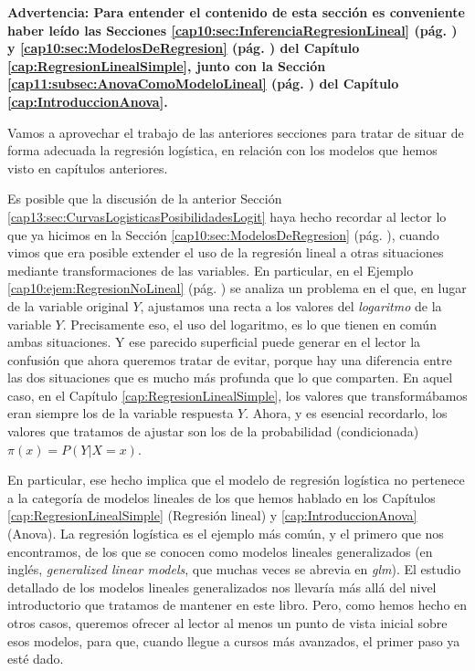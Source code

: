 {\bf Advertencia: Para entender el contenido de esta sección es conveniente haber leído las Secciones \ref{cap10:sec:InferenciaRegresionLineal} (pág. \pageref{cap10:sec:InferenciaRegresionLineal}) y \ref{cap10:sec:ModelosDeRegresion} (pág. \pageref{cap10:sec:ModelosDeRegresion}) del Capítulo \ref{cap:RegresionLinealSimple}, junto con la Sección \ref{cap11:subsec:AnovaComoModeloLineal} (pág. \pageref{cap11:subsec:AnovaComoModeloLineal}) del Capítulo \ref{cap:IntroduccionAnova}.}


Vamos a aprovechar el trabajo de las anteriores secciones para tratar de situar de forma adecuada la regresión logística, en relación con los modelos que hemos visto en capítulos anteriores.

Es posible que la discusión de la anterior Sección \ref{cap13:sec:CurvasLogisticasPosibilidadesLogit} haya hecho recordar al lector lo que ya hicimos en la Sección \ref{cap10:sec:ModelosDeRegresion} (pág. \pageref{cap10:sec:ModelosDeRegresion}), cuando vimos que era posible extender el uso de la regresión lineal a otras situaciones mediante transformaciones de las variables. En particular, en el Ejemplo \ref{cap10:ejem:RegresionNoLineal} (pág. \pageref{cap10:ejem:RegresionNoLineal}) se analiza un problema en el que, en lugar de la variable original $Y$, ajustamos una recta a los valores del {\em logaritmo} de la variable $Y$.  Precisamente eso, el uso del logaritmo, es lo que tienen en común ambas situaciones. Y ese parecido superficial puede generar en el lector la confusión que ahora queremos tratar de evitar, porque hay una diferencia entre las dos situaciones que es mucho más profunda que lo que comparten. En aquel caso, en el Capítulo \ref{cap:RegresionLinealSimple}, los valores que transformábamos eran siempre los de la variable respuesta $Y$. Ahora, y es esencial recordarlo, los valores que tratamos de ajustar son los de la probabilidad (condicionada) $\pi(x)=P(Y|X=x)$.

En particular, ese hecho implica que el modelo de regresión logística no pertenece a la categoría de modelos lineales de los que hemos hablado en los Capítulos \ref{cap:RegresionLinealSimple} (Regresión lineal) y \ref{cap:IntroduccionAnova} (Anova). La regresión logística es el ejemplo más común, y el primero que nos encontramos, de los que se conocen como {\sf modelos lineales generalizados} (en inglés, {\em generalized linear models}, que muchas veces se abrevia en {\em glm}). El estudio detallado de los modelos lineales generalizados nos llevaría más allá del nivel introductorio que tratamos de mantener en este libro. Pero, como hemos hecho en otros casos, queremos ofrecer al lector al menos un punto de vista inicial sobre esos modelos, para que, cuando llegue a cursos más avanzados, el primer paso ya esté dado.

